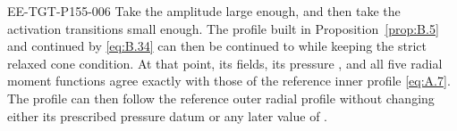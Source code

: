 \begin{proposition}\label{prop:B.8}
\begin{EESegment}{EE-TGT-P155-006}
Take the amplitude  large enough, and then take the activation
transitions small enough. The profile built in Proposition~\ref{prop:B.5} and continued by
\eqref{eq:B.34} can then be continued to  while keeping the strict
relaxed cone condition. At that point, its fields, its pressure , and all
five radial moment functions  agree exactly with those of the
reference inner profile \eqref{eq:A.7}. The profile can then follow the reference outer radial
profile without changing either its prescribed pressure datum or any later value of
.
\end{EESegment}
\end{proposition}
